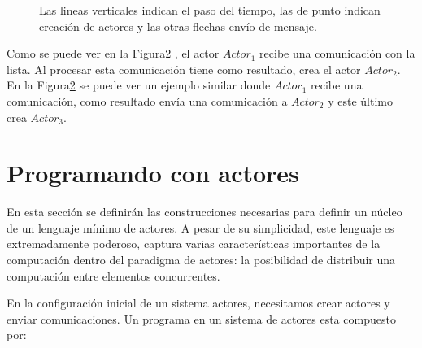 \begin{figure}[H]
\begin{subfigure}{.5\textwidth}

\label{fig:actores:crecion:b}
\caption{}
\end{subfigure}

\label{fig:actores:crecion}
\caption{Las lineas verticales indican el paso del tiempo, las de punto indican creación de actores y las otras flechas envío de mensaje.}
\end{figure}

Como se puede ver en la Figura\ref{fig:actores:crecion} , el actor $Actor_1$ recibe una comunicación con la lista. Al procesar esta comunicación tiene como resultado, crea el actor $Actor_2$. En la Figura\ref{fig:actores:crecion}  se puede ver un ejemplo similar donde $Actor_1$ recibe una comunicación, como resultado envía una comunicación a $Actor_2$ y este último crea $Actor_3$.

\section{Programando con actores}

En esta sección se definirán las construcciones necesarias para definir un núcleo de un lenguaje mínimo de actores. A pesar de su simplicidad, este lenguaje es extremadamente poderoso, captura varias características importantes de la computación dentro del paradigma de actores: la posibilidad de distribuir una computación entre elementos concurrentes.

En la configuración inicial de un sistema actores, necesitamos crear  actores y enviar comunicaciones. Un programa en un sistema de actores esta compuesto por:

